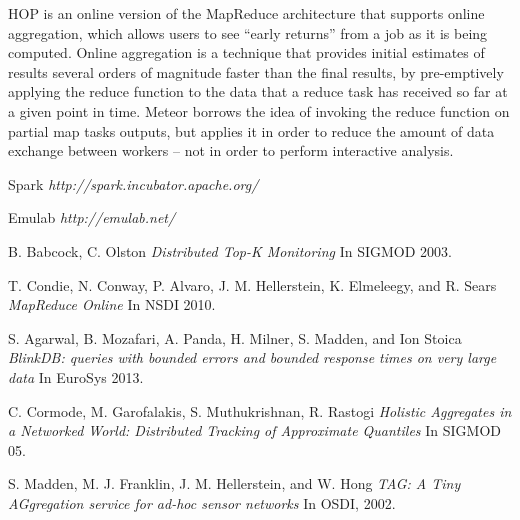 \documentclass{article}
\begin{document}
HOP \cite{4} is an online version of the MapReduce architecture that supports online aggregation, which allows users to see “early returns” from a job as it is being computed. Online aggregation is a technique that provides initial estimates of results several orders of magnitude faster than the final results, by pre-emptively applying the reduce function to the data that a reduce task has received so far at a given point in time. Meteor borrows the idea of  invoking the reduce function on partial map tasks outputs, but applies it in order to reduce the amount of data exchange between workers – not in order to perform interactive analysis.

\begin{thebibliography}{9}

   Spark {\em http://spark.incubator.apache.org/}

   Emulab {\em http://emulab.net/}

   B. Babcock, C. Olston {\em Distributed Top-K Monitoring} In SIGMOD 2003.
  
   T. Condie, N. Conway, P. Alvaro, J. M. Hellerstein, K. Elmeleegy, and R. Sears {\em MapReduce Online} In NSDI 2010.
  
   S. Agarwal, B. Mozafari, A. Panda, H. Milner, S. Madden, and Ion Stoica {\em BlinkDB: queries with bounded errors and bounded response times on very large data} In EuroSys 2013.
  
   C. Cormode, M. Garofalakis, S. Muthukrishnan, R. Rastogi {\em Holistic Aggregates in a Networked World: Distributed Tracking of Approximate Quantiles} In SIGMOD 05.
  
   S. Madden, M. J. Franklin, J. M. Hellerstein, and W. Hong {\em TAG: A Tiny AGgregation service for ad-hoc sensor networks} In OSDI, 2002.
  
\end{thebibliography}
\end{document}
